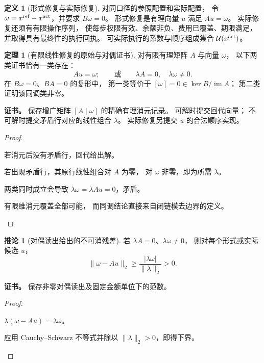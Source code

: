 \documentclass[UTF8,12pt,a4paper,openany,fontset=none,zihao=false]{ctexrep}
\theoremstyle{definition}
\newtheorem{definition}{定义}[chapter]
\newtheorem{theorem}{定理}[chapter]
\newtheorem{corollary}{推论}[chapter]
\newenvironment{certificate}{\par\noindent\textbf{证书。}\ignorespaces}{\par}
\newcommand{\1}{\mathbf 1}
\begin{document}
\begin{definition}[形式修复与实际修复]
\label{r:execution-domain}
对同口径的参照配置和实际配置，
令 \(\omega=x^{\rm ref}-x^{\rm act}\)，并要求 \(B\omega=0\)。
形式修复是有理向量 \(u\) 满足 \(Au=\omega\)。
实际修复还须有有限操作序列，
使每步权限有效、余额非负、费用已覆盖、期限满足，
并取得具有最终性的执行回执。
可实际执行的系数与顺序组成集合 \(\mathcal U(x^{\rm act})\)。
\end{definition}
\begin{theorem}[有限线性修复的原始与对偶证书]
\label{r:dual}
对有限有理矩阵 \(A\) 与向量 \(\omega\)，
以下两类证书恰有一类存在：
\[
Au=\omega;
\qquad\text{或}\qquad
\lambda A=0,\quad\lambda\omega\ne0.
\]
在 \(B\omega=0\)、\(BA=0\) 的复形中，
第一类等价于 \([\omega]=0\in\ker B/\operatorname{im}A\)；
第二类证明该同调类非零。
\end{theorem}
\begin{certificate}
保存增广矩阵 \([A\mid\omega]\) 的精确有理消元记录。
可解时提交回代向量；
不可解时提交矛盾行对应的线性组合 \(\lambda\)。
实际修复另提交 \(u\) 的合法顺序实现。
\end{certificate}
\begin{proof}
\begin{semanticsteps}
\item 若消元后没有矛盾行，回代给出解。
\item 若出现矛盾行，其原行线性组合对 \(A\) 为零，
对 \(\omega\) 非零，即为所需 \(\lambda\)。
\item 两类同时成立会导致
\(\lambda\omega=\lambda Au=0\)，矛盾。
\item 有限维消元覆盖全部可能，
而同调结论直接来自闭链模去边界的定义。
\end{semanticsteps}
\end{proof}
\begin{corollary}[对偶读出给出的不可消残差]
\label{r:residual}
若 \(\lambda A=0\)、\(\lambda\omega\ne0\)，
则对每个形式或实际候选 \(u\)，
\[
\|\omega-Au\|_2
\ge\frac{|\lambda\omega|}{\|\lambda\|_2}>0.
\]
\end{corollary}
\begin{certificate}
保存非零对偶读出及固定金额单位下的范数。
\end{certificate}
\begin{proof}
\begin{semanticsteps}
\item \(\lambda(\omega-Au)=\lambda\omega\)。
\item 应用 Cauchy--Schwarz 不等式并除以
\(\|\lambda\|_2>0\)，即得下界。
\end{semanticsteps}
\end{proof}
\end{document}
